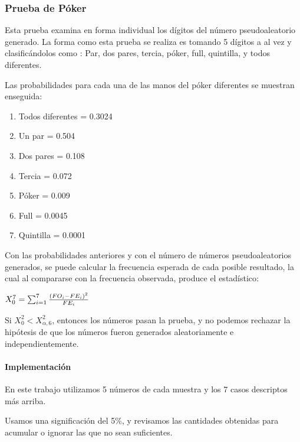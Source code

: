 \subsubsection{Prueba de Póker}
Esta prueba examina en forma individual los dígitos del número pseudoaleatorio generado. La forma como esta prueba se
realiza es tomando 5 dígitos a al vez y clasificándolos como : Par, dos pares, tercia, póker, full, quintilla, y todos
diferentes.

Las probabilidades para cada una de las manos del póker diferentes se muestran enseguida:

\begin{enumerate}
    \item Todos diferentes = 0.3024
    \item Un par = 0.504
    \item Dos pares = 0.108
    \item Tercia = 0.072
    \item Póker = 0.009
    \item Full = 0.0045
    \item Quintilla = 0.0001
\end{enumerate}

Con las probabilidades anteriores y con el número de números pseudoaleatorios generados, se puede calcular la frecuencia
esperada de cada posible resultado, la cual al compararse con la frecuencia observada, produce el estadístico:

$X^7_0 = \sum_{i=1}^{7} {(FO_i-FE_i)^2 \over FE_i}$

Si $X^2_0 < X^2_{\alpha,6}$, entonces los números pasan la prueba, y no podemos rechazar la hipótesis de que los números
fueron generados aleatoriamente e independientemente.

\paragraph{Implementación}
En este trabajo utilizamos 5 números de cada muestra y los 7 casos descriptos más arriba.

Usamos una significación del 5\%, y revisamos las cantidades obtenidas para acumular o ignorar las que no sean
suficientes.
